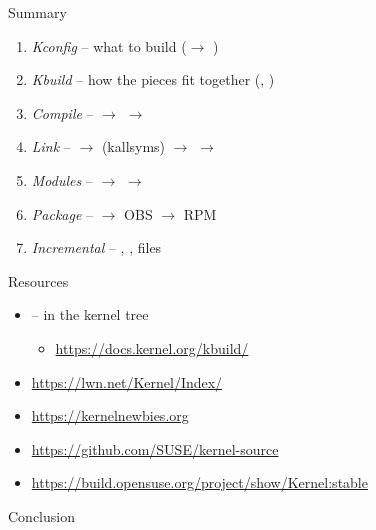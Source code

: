\begin{frame}{Summary}

  \begin{enumerate}[<+->]
    \item \emph{Kconfig} -- what to build ($\rightarrow$ )
    \item \emph{Kbuild} -- how the pieces fit together (, )
    \item \emph{Compile} --  $\rightarrow$  $\rightarrow$
    \item \emph{Link} --  $\rightarrow$ (kallsyms) $\rightarrow$
       $\rightarrow$ 
    \item \emph{Modules} --  $\rightarrow$  $\rightarrow$ 
    \item \emph{Package} --  $\rightarrow$ OBS $\rightarrow$ RPM
    \item \emph{Incremental} -- , ,  files
  \end{enumerate}

\end{frame}

\begin{frame}{Resources}

  \begin{itemize}
    \item {} -- in the kernel tree
      \begin{itemize}
	\item \url{https://docs.kernel.org/kbuild/}
      \end{itemize}
    \item \url{https://lwn.net/Kernel/Index/}
    \item \url{https://kernelnewbies.org}
    \item \url{https://github.com/SUSE/kernel-source}
    \item \url{https://build.opensuse.org/project/show/Kernel:stable}
  \end{itemize}

\end{frame}

\begin{frame}{Conclusion}

 \begin{center} \Huge
    \\[.6em]
 \end{center}

\end{frame}



